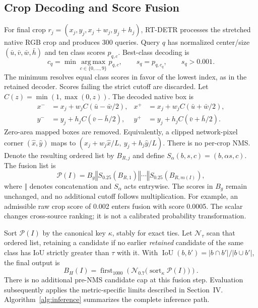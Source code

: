 \documentclass[journal]{IEEEtran}
\begin{document}
\subsection{Crop Decoding and Score Fusion}
For final crop $r_j=(x_j,y_j,x_j+w_j,y_j+h_j)$, RT-DETR processes the stretched native RGB crop and produces 300 queries. Query $q$ has normalized center/size $(\bar u,\bar v,\bar w,\bar h)$ and ten class scores $p_{q,c}$. Best-class decoding is
\begin{equation}
c_q=\min\operatorname*{arg\,max}_{c\in\{0,\ldots,9\}}p_{q,c},
\qquad s_q=p_{q,c_q},\qquad s_q>0.001.
\label{eq:query-decoding}
\end{equation}
The minimum resolves equal class scores in favor of the lowest index, as in the retained decoder. Scores failing the strict cutoff are discarded. Let $C(z)=\min(1,\max(0,z))$. The decoded native box is
\begin{equation}
\begin{aligned}
x^-&=x_j+w_jC(\bar u-\bar w/2),&
x^+&=x_j+w_jC(\bar u+\bar w/2),\\
y^-&=y_j+h_jC(\bar v-\bar h/2),&
y^+&=y_j+h_jC(\bar v+\bar h/2).
\end{aligned}
\label{eq:mapping}
\end{equation}
Zero-area mapped boxes are removed. Equivalently, a clipped network-pixel corner $(\hat x,\hat y)$ maps to $(x_j+w_j\hat x/L,\ y_j+h_j\hat y/L)$. There is no per-crop NMS. Denote the resulting ordered list by $B_{R,j}$ and define $S_\alpha(b,s,c)=(b,\alpha s,c)$. The fusion list is
\begin{equation}
\mathcal P(I)=B_g\mathbin{\Vert}
S_{0.25}(B_{R,1})\mathbin{\Vert}\cdots\mathbin{\Vert}
S_{0.25}(B_{R,m(I)}),
\label{eq:fusion}
\end{equation}
where $\Vert$ denotes concatenation and $S_\alpha$ acts entrywise. The scores in $B_g$ remain unchanged, and no additional cutoff follows multiplication. For example, an admissible raw crop score of 0.002 enters fusion with score 0.0005. The scalar changes cross-source ranking; it is not a calibrated probability transformation.

Sort $\mathcal P(I)$ by the canonical key $\kappa$, stably for exact ties. Let $\mathcal N_{\tau}$ scan that ordered list, retaining a candidate if no earlier \emph{retained} candidate of the same class has IoU strictly greater than $\tau$ with it. With $\operatorname{IoU}(b,b')=|b\cap b'|/|b\cup b'|$, the final output is
\begin{equation}
B_H(I)=\operatorname{first}_{1000}
\left(\mathcal N_{0.7}\bigl(\operatorname{sort}_{\kappa}\mathcal P(I)\bigr)\right).
\label{eq:final-output}
\end{equation}
There is no additional pre-NMS candidate cap at this fusion step. Evaluation subsequently applies the metric-specific limits described in Section~IV. Algorithm~\ref{alg:inference} summarizes the complete inference path.
\end{document}
